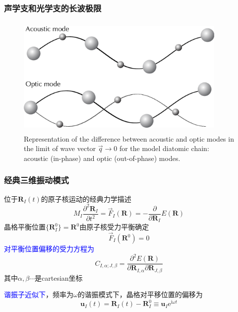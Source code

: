 \frame
{
	\frametitle{声学支和光学支的长波极限}
\begin{figure}[h!]
\centering
\vspace*{-0.10in}
\includegraphics[height=2.3in,width=4.0in,viewport=0 0 1210 650,clip]{Figures/Phonon-Acoutic-Optic.png}
\caption{\tiny \textrm{Representation of the difference between acoustic and optic modes in the limit of wave vector $\vec q\rightarrow0$ for the model diatomic chain: acoustic (in-phase) and optic (out-of-phase) modes.}}%
\label{Aucous-Optic}
\end{figure} 
}

\frame
{
	\frametitle{经典三维振动模式}
	位于$\mathbf{R}_I(t)$的原子核运动的经典力学描述
			\begin{displaymath}
				M_I\frac{\partial^2\mathbf{R}_I}{\partial t^2}=\vec F_I(\mathbf{R})=-\frac{\partial}{\partial\mathbf{R}_I}E(\mathbf{R})
			\end{displaymath}
			晶格平衡位置$\{\mathbf{R}_I^0\}=\mathbf R^0$由原子核受力平衡确定
			\begin{displaymath}
				\vec F_I(\mathbf R^0)=0
			\end{displaymath}
			\textcolor{blue}{对平衡位置偏移的受力方程为}
			\begin{displaymath}
				C_{I,\alpha;J,\beta}=\frac{\partial^2E(\mathbf{R})}{\partial\mathbf{R}_{I,\alpha}\partial\mathbf{R}_{J,\beta}}
			\end{displaymath}
			其中$\alpha,\beta\cdots$是\textrm{cartesian}坐标

			\textcolor{blue}{谐振子近似下}，频率为$\omega$的谐振模式下，晶格对平移位置的偏移为
			\begin{displaymath}
				\mathbf{u}_I(t)=\mathbf{R}_I(t)-\mathbf{R}_I^0\equiv\mathbf{u}_I\mathrm{e}^{\mathrm{i}\omega t}
			\end{displaymath}
}

